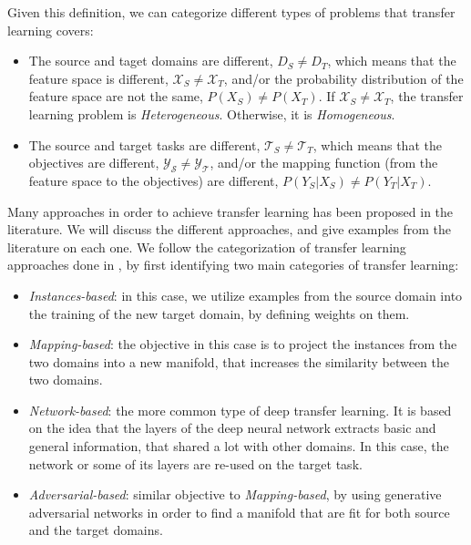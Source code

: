   \par Given this definition, we can categorize different types of problems that transfer learning covers:

  \begin{itemize}
      \item The source and taget domains are different, $D_S \neq D_T$, which means that the feature space is different, $\mathcal{X}_S \neq \mathcal{X}_T$, and/or the probability distribution of the feature space are not the same, $P(X_S) \neq P(X_T)$. If $\mathcal{X}_S \neq \mathcal{X}_T$, the transfer learning problem is \textit{Heterogeneous}. Otherwise, it is \textit{Homogeneous}.

      \item The source and target tasks are different, $\mathcal{T}_S \neq \mathcal{T}_T$, which means that the objectives are different, $\mathcal{Y_S} \neq \mathcal{Y_T}$, and/or the mapping function (from the feature space to the objectives) are different, $P(Y_S|X_S) \neq P(Y_T|X_T)$.
  \end{itemize}

  \par Many approaches in order to achieve transfer learning has been proposed in the literature. We will discuss the different approaches, and give examples from the literature on each one. We follow the categorization of transfer learning approaches done in \citep{dtl2018survey}, by first identifying two main categories of transfer learning:
  \begin{itemize}
    \item \textit{Instances-based}: in this case, we utilize examples from the source domain into the training of the new target domain, by defining weights on them.
    \item \textit{Mapping-based}: the objective in this case is to project the instances from the two domains into a new manifold, that increases the similarity between the two domains.
    \item \textit{Network-based}: the more common type of deep transfer learning. It is based on the idea that the layers of the deep neural network extracts basic and general information, that shared a lot with other domains. In this case, the network or some of its layers are re-used on the target task.
    \item \textit{Adversarial-based}: similar objective to \textit{Mapping-based}, by using generative adversarial networks \citep{goodfellow2014generative} in order to find a manifold that are fit for both source and the target domains.
  \end{itemize}


